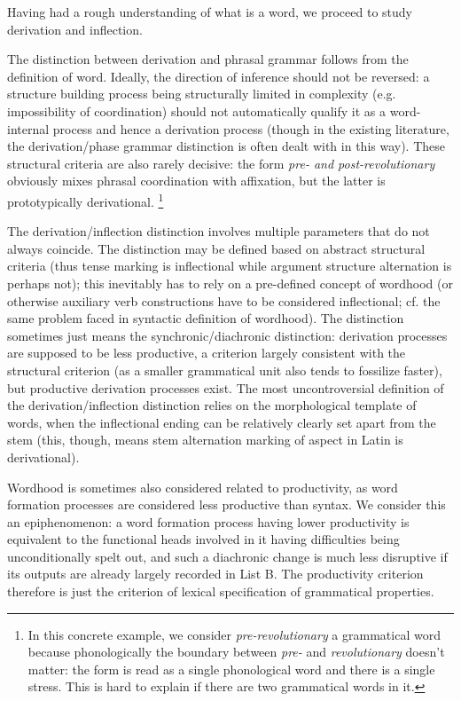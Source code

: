 \documentclass[UTF8, a4paper, oneside, scheme=plain, 12pt]{ctexrep}
\newcommand{\form}[1]{\emph{#1}}
\begin{document}
{Having had a rough understanding of what is a word, we proceed to study derivation and inflection.

The distinction between derivation and phrasal grammar follows from the definition of word.
Ideally, the direction of inference should not be reversed:
a structure building process being structurally limited in complexity (e.g. impossibility of coordination) should not automatically qualify it as a word-internal process and hence a derivation process (though in the existing literature, the derivation/phase grammar distinction is often dealt with in this way).
These structural criteria are also rarely decisive:
the form \form{pre- and post-revolutionary} obviously mixes phrasal coordination with affixation, but the latter is prototypically derivational.%
\footnote{
    In this concrete example, we consider \form{pre-revolutionary} a grammatical word 
    because phonologically the boundary between \form{pre-} and \form{revolutionary} doesn't matter:
    the form is read as a single phonological word and there is a single stress.
    This is hard to explain if there are two grammatical words in it.
}

The derivation/inflection distinction involves multiple parameters that do not always coincide.
The distinction may be defined based on abstract structural criteria
(thus tense marking is inflectional while argument structure alternation is perhaps not);
this inevitably has to rely on a pre-defined concept of wordhood
(or otherwise auxiliary verb constructions have to be considered inflectional; cf. the same problem faced in syntactic definition of wordhood).
The distinction sometimes just means the synchronic/diachronic distinction:
derivation processes are supposed to be less productive,
a criterion largely consistent with the structural criterion 
(as a smaller grammatical unit also tends to fossilize faster),
but productive derivation processes exist.
The most uncontroversial definition of the derivation/inflection distinction relies on the morphological template of words,
when the inflectional ending can be relatively clearly set apart from the stem
(this, though, means stem alternation marking of aspect in Latin is derivational).

Wordhood is sometimes also considered related to productivity,
as word formation processes are considered less productive than syntax.
We consider this an epiphenomenon:
a word formation process having lower productivity is equivalent to the functional heads involved in it having difficulties being unconditionally spelt out, 
and such a diachronic change is much less disruptive if its outputs are already largely recorded in List B.
The productivity criterion therefore is just the criterion of lexical specification of grammatical properties.

}
\end{document}
